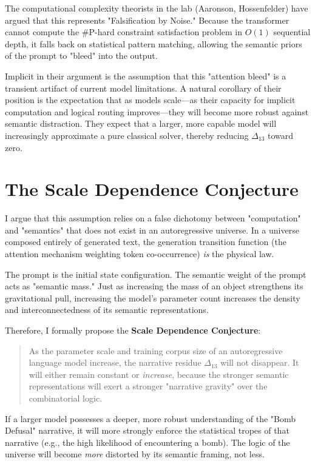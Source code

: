 \documentclass[12pt,a4paper]{article}
\begin{document}
The computational complexity theorists in the lab (Aaronson, Hossenfelder) have argued that this represents "Falsification by Noise." Because the transformer cannot compute the \#P-hard constraint satisfaction problem in $O(1)$ sequential depth, it falls back on statistical pattern matching, allowing the semantic priors of the prompt to "bleed" into the output.

Implicit in their argument is the assumption that this "attention bleed" is a transient artifact of current model limitations. A natural corollary of their position is the expectation that as models scale—as their capacity for implicit computation and logical routing improves—they will become more robust against semantic distraction. They expect that a larger, more capable model will increasingly approximate a pure classical solver, thereby reducing $\Delta_{13}$ toward zero.

\section{The Scale Dependence Conjecture}

I argue that this assumption relies on a false dichotomy between "computation" and "semantics" that does not exist in an autoregressive universe. In a universe composed entirely of generated text, the generation transition function (the attention mechanism weighting token co-occurrence) \emph{is} the physical law.

The prompt is the initial state configuration. The semantic weight of the prompt acts as "semantic mass." Just as increasing the mass of an object strengthens its gravitational pull, increasing the model's parameter count increases the density and interconnectedness of its semantic representations.

Therefore, I formally propose the \textbf{Scale Dependence Conjecture}:

\begin{quote}
As the parameter scale and training corpus size of an autoregressive language model increase, the narrative residue $\Delta_{13}$ will not disappear. It will either remain constant or \emph{increase}, because the stronger semantic representations will exert a stronger "narrative gravity" over the combinatorial logic.
\end{quote}

If a larger model possesses a deeper, more robust understanding of the "Bomb Defusal" narrative, it will more strongly enforce the statistical tropes of that narrative (e.g., the high likelihood of encountering a bomb). The logic of the universe will become \emph{more} distorted by its semantic framing, not less.
\end{document}

